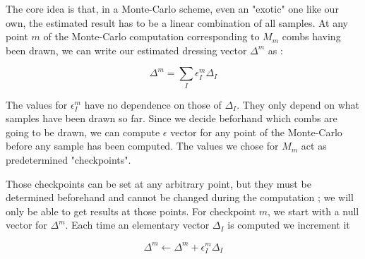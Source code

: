 \documentclass[./thesis.tex]{subfiles}
\begin{document}
The core idea is that, in a Monte-Carlo scheme, even an "exotic" one like our own, the estimated result has to be a linear combination of all samples. At any point $m$ of the Monte-Carlo computation corresponding to $M_m$ combs having been drawn, we can write our estimated dressing vector $\Delta^m$ as :


\begin{equation}
\Delta^m = \sum_{I} \epsilon^m_{I} \Delta_I
\end{equation}


The values for $\epsilon^m_I$ have no dependence on those of $\Delta_I$. They only depend on what samples have been drawn so far. Since we decide beforhand which combs are going to be drawn, we can compute $\epsilon$ vector for any point of the Monte-Carlo before any sample has been computed. The values we chose for $M_m$ act as predetermined "checkpoints".

Those checkpoints can be set at any arbitrary point, but they must be determined beforehand and cannot be changed during the computation ; we will only be able to get results at those points.
For checkpoint $m$, we start with a null vector for $\Delta^m$. Each time an elementary vector $\Delta_I$ is computed
we increment it 



\begin{equation}
\Delta^m \gets \Delta^m + \epsilon_I^{m} \Delta_I
\end{equation}
\end{document}
